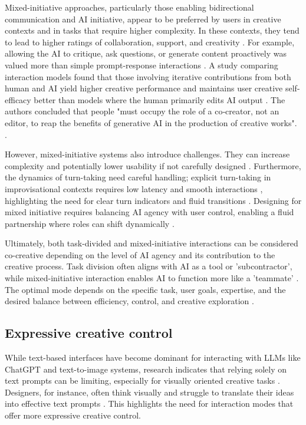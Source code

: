 Mixed-initiative approaches, particularly those enabling bidirectional communication and AI initiative, appear to be preferred by users in creative contexts and in tasks that require higher complexity. In these contexts, they tend to lead to higher ratings of collaboration, support, and creativity \cite{Lin2023-jd}. For example, allowing the AI to critique, ask questions, or generate content proactively was valued more than simple prompt-response interactions \cite{Lin2023-jd}. A study comparing interaction models found that those involving iterative contributions from both human and AI yield higher creative performance and maintains user creative self-efficacy better than models where the human primarily edits AI output \cite{McGuire2024-im}. The authors concluded that people "must occupy the role of a co‑creator, not an editor, to reap the benefits of generative AI in the production of creative works". \cite{McGuire2024-im}.

However, mixed-initiative systems also introduce challenges. They can increase complexity and potentially lower usability if not carefully designed \cite{Lin2023-jd}. Furthermore, the dynamics of turn-taking need careful handling; explicit turn-taking in improvisational contexts requires low latency and smooth interactions \cite{Winston2017-nb}, highlighting the need for clear turn indicators and fluid transitions \cite{Shakeri2021-dx}. Designing for mixed initiative requires balancing AI agency with user control, enabling a fluid partnership where roles can shift dynamically \cite{Zhou2024-vp, Lawton2023-gd}.

Ultimately, both task-divided and mixed-initiative interactions can be considered co-creative depending on the level of AI agency and its contribution to the creative process. Task division often aligns with AI as a tool or 'subcontractor', while mixed-initiative interaction enables AI to function more like a 'teammate' \cite{Lin2023-zq}. The optimal mode depends on the specific task, user goals, expertise, and the desired balance between efficiency, control, and creative exploration \cite{Moruzzi2024-cq, Ding2024-kg, Weisz2024-io}.

\subsection{Expressive creative control}

While text-based interfaces have become dominant for interacting with LLMs like ChatGPT and text-to-image systems, research indicates that relying solely on text prompts can be limiting, especially for visually oriented creative tasks \cite{Park2024-gw, Tholander2023-rv, Verheijden2023-gn}. Designers, for instance, often think visually and struggle to translate their ideas into effective text prompts \cite{Park2024-gw, Peng2024-tr}. This highlights the need for interaction modes that offer more expressive creative control. 

